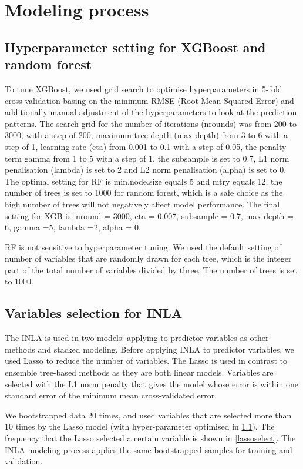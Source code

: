 \documentclass{article}
\begin{document}
\section{Modeling process}

\subsection{Hyperparameter setting for XGBoost and random forest}
\label{sec:hp}

To tune XGBoost, we used grid search to optimise hyperparameters in 5-fold cross-validation basing on the minimum RMSE (Root Mean Squared Error) and additionally manual adjustment of the hyperparameters to look at the prediction patterns. The search grid for the number of iterations (nrounds) was from 200 to 3000, with a step of 200; maximum tree depth (max-depth) from 3 to 6 with a step of 1, learning rate (eta) from 0.001 to 0.1 with a step of 0.05, the penalty term gamma \citep{xgboost}  from 1 to 5 with a step of 1, the subsample is set to 0.7, L1 norm penalisation (lambda) is set to 2 and L2 norm penalisation (alpha) is set to 0.  The optimal setting for RF is min.node.size equals 5 and mtry equals 12, the number of trees is set to 1000 for random forest, which is a safe choice as the high number of trees will not negatively affect model performance. The final setting for XGB is: nround = 3000, eta = 0.007, subsample = 0.7, max-depth = 6, gamma =5, lambda =2, alpha = 0. 

RF is not sensitive to hyperparameter tuning. We used the default setting of number of variables that are randomly drawn for each tree\citep{breiman2001random}, which is the integer part of the total number of variables divided by three. The number of trees is set to 1000. 


\subsection{Variables selection for INLA} 

The INLA is used in two models:  applying to predictor variables as other methods and stacked modeling. Before applying INLA to predictor variables, we used Lasso to reduce the number of variables. The Lasso is used in contrast to ensemble tree-based methods as they are both linear models. 
Variables are selected with the L1 norm penalty that gives the model whose error is within one standard error of the minimum mean cross-validated error.

We bootstrapped data 20 times, and used variables that are selected more than 10 times by the Lasso model (with hyper-parameter optimised in \cref{sec:hp}). The frequency that the Lasso selected a certain variable is shown in \cref{lassoselect}. The INLA modeling process applies the same bootstrapped samples for training and validation. 
\end{document}
